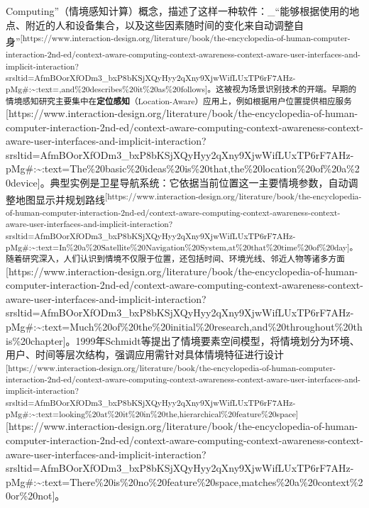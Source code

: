 \documentclass[
  letterpaper,
]{scrbook}
\begin{document}
Computing''（情境感知计算）概念，描述了这样一种软件：\_``能够根据使用的地点、附近的人和设备集合，以及这些因素随时间的变化来自动调整自身''\textsuperscript{{[}https://www.interaction-design.org/literature/book/the-encyclopedia-of-human-computer-interaction-2nd-ed/context-aware-computing-context-awareness-context-aware-user-interfaces-and-implicit-interaction?srsltid=AfmBOorXfODm3\_bxP8bKSjXQyHyy2qXny9XjwWifLUxTP6rF7AHz-pMg\#:\textasciitilde:text=,and\%20describes\%20it\%20as\%20follows{]}。这被视为场景识别技术的开端。早期的情境感知研究主要集中在\textbf{定位感知}（Location-Aware）应用上，例如根据用户位置提供相应服务}{[}https://www.interaction-design.org/literature/book/the-encyclopedia-of-human-computer-interaction-2nd-ed/context-aware-computing-context-awareness-context-aware-user-interfaces-and-implicit-interaction?srsltid=AfmBOorXfODm3\_bxP8bKSjXQyHyy2qXny9XjwWifLUxTP6rF7AHz-pMg\#:\textasciitilde:text=The\%20basic\%20ideas\%20is\%20that,the\%20location\%20of\%20a\%20device{]}。典型实例是卫星导航系统：它依据当前位置这一主要情境参数，自动调整地图显示并规划路线\textsuperscript{{[}https://www.interaction-design.org/literature/book/the-encyclopedia-of-human-computer-interaction-2nd-ed/context-aware-computing-context-awareness-context-aware-user-interfaces-and-implicit-interaction?srsltid=AfmBOorXfODm3\_bxP8bKSjXQyHyy2qXny9XjwWifLUxTP6rF7AHz-pMg\#:\textasciitilde:text=In\%20a\%20Satellite\%20Navigation\%20System,at\%20that\%20time\%20of\%20day{]}。随着研究深入，人们认识到情境不仅限于位置，还包括时间、环境光线、邻近人物等诸多方面}{[}https://www.interaction-design.org/literature/book/the-encyclopedia-of-human-computer-interaction-2nd-ed/context-aware-computing-context-awareness-context-aware-user-interfaces-and-implicit-interaction?srsltid=AfmBOorXfODm3\_bxP8bKSjXQyHyy2qXny9XjwWifLUxTP6rF7AHz-pMg\#:\textasciitilde:text=Much\%20of\%20the\%20initial\%20research,and\%20throughout\%20this\%20chapter{]}。1999年Schmidt等提出了情境要素空间模型，将情境划分为环境、用户、时间等层次结构，强调应用需针对具体情境特征进行设计\textsuperscript{{[}https://www.interaction-design.org/literature/book/the-encyclopedia-of-human-computer-interaction-2nd-ed/context-aware-computing-context-awareness-context-aware-user-interfaces-and-implicit-interaction?srsltid=AfmBOorXfODm3\_bxP8bKSjXQyHyy2qXny9XjwWifLUxTP6rF7AHz-pMg\#:\textasciitilde:text=looking\%20at\%20it\%20in\%20the,hierarchical\%20feature\%20space{]}}{[}https://www.interaction-design.org/literature/book/the-encyclopedia-of-human-computer-interaction-2nd-ed/context-aware-computing-context-awareness-context-aware-user-interfaces-and-implicit-interaction?srsltid=AfmBOorXfODm3\_bxP8bKSjXQyHyy2qXny9XjwWifLUxTP6rF7AHz-pMg\#:\textasciitilde:text=There\%20is\%20no\%20feature\%20space,matches\%20a\%20context\%20or\%20not{]}。
\end{document}
